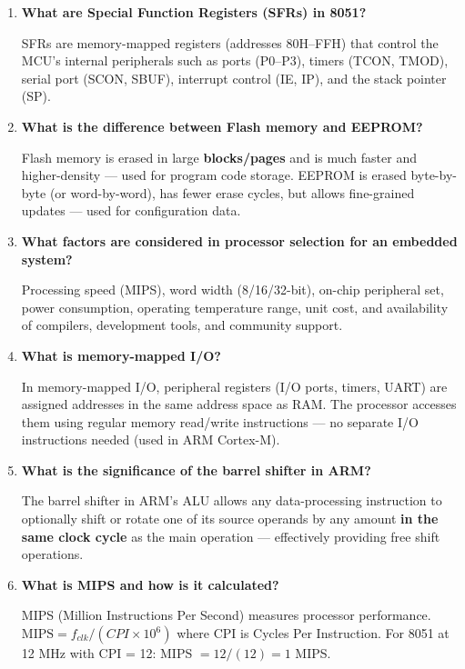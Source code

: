 \documentclass[12pt,a4paper]{article}
\newcommand{\Q}[1]{\textbf{#1}\par\noindent\ignorespaces}
\begin{document}
\begin{tcolorbox}[exambox, title={\textbf{Frequently Asked / Viva Questions}}]
\begin{enumerate}[topsep=0pt, label=\textbf{Q\arabic*.}, itemsep=5pt]
  \item \Q{What are Special Function Registers (SFRs) in 8051?}
    SFRs are memory-mapped registers (addresses 80H--FFH) that control the MCU's internal peripherals such as ports (P0--P3), timers (TCON, TMOD), serial port (SCON, SBUF), interrupt control (IE, IP), and the stack pointer (SP).
  \item \Q{What is the difference between Flash memory and EEPROM?}
    Flash memory is erased in large \textbf{blocks/pages} and is much faster and higher-density --- used for program code storage. EEPROM is erased byte-by-byte (or word-by-word), has fewer erase cycles, but allows fine-grained updates --- used for configuration data.
  \item \Q{What factors are considered in processor selection for an embedded system?}
    Processing speed (MIPS), word width (8/16/32-bit), on-chip peripheral set, power consumption, operating temperature range, unit cost, and availability of compilers, development tools, and community support.
  \item \Q{What is memory-mapped I/O?}
    In memory-mapped I/O, peripheral registers (I/O ports, timers, UART) are assigned addresses in the same address space as RAM. The processor accesses them using regular memory read/write instructions --- no separate I/O instructions needed (used in ARM Cortex-M).
  \item \Q{What is the significance of the barrel shifter in ARM?}
    The barrel shifter in ARM's ALU allows any data-processing instruction to optionally shift or rotate one of its source operands by any amount \textbf{in the same clock cycle} as the main operation --- effectively providing free shift operations.
  \item \Q{What is MIPS and how is it calculated?}
    MIPS (Million Instructions Per Second) measures processor performance. $\text{MIPS} = f_{clk} / (CPI \times 10^6)$ where CPI is Cycles Per Instruction. For 8051 at 12 MHz with CPI = 12: MIPS $= 12/(12) = 1$ MIPS.
\end{enumerate}
\end{tcolorbox}
\end{document}
